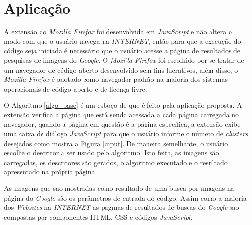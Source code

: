 \section{Aplicação}
A extensão do \emph{Mozilla Firefox} foi desenvolvida em \emph{JavaScript} e não altera o modo com que o usuário navega na \emph{INTERNET}, então para que a execução do código seja iniciada é necessário que o usuário acesse a página de resultados de pesquisas de imagens do \emph{Google}. O \emph{Mozilla Firefox} foi escolhido por se tratar de um navegador de código aberto desenvolvido sem fins lucrativos, além disso, o \emph{Mozilla Firefox} é adotado como navegador padrão na maioria dos sistemas operacionais de código aberto e de licença livre.

O Algoritmo \ref{algo_base} é um esboço do que é feito pela aplicação proposta. A extensão verifica a página que está sendo acessada a cada página carregada no navegador, quando a página em questão é a página específica, a extensão exibe uma caixa de diálogo \emph{JavaScript} para que o usuário informe o número de \emph{clusters} desejados como mostra a Figura \ref{input}. De maneira semelhante, o usuário escolhe o descritor a ser usado pelo algoritmo. Isto feito, as imagens são carregadas, os descritores são gerados, o algoritmo executado e o resultado apresentado na própria página.

As imagens que são mostradas como resultado de uma busca por imagens na página do \emph{Google} são os parâmetros de entrada do código. Assim como a maioria dos \emph{Websites} na \emph{INTERNET} as páginas de resultados de buscas do \emph{Google} são compostas por componentes HTML, CSS e códigos \emph{JavaScript}. 

